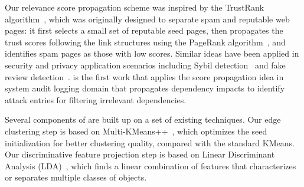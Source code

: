 Our relevance score propagation scheme was inspired by the TrustRank algorithm~\cite{Gyongyi:2004:vldb}, which was originally designed to separate spam and reputable web pages: it first selects a small set of reputable seed pages, then propagates the trust scores following the link structures using the PageRank algorithm~\cite{pagerank}, and identifies spam pages as those with low scores. Similar ideas have been applied in security and privacy application scenarios
including Sybil detection~\cite{cao2012sybilrank,gao2018sybilfuse} and fake review detection~\cite{Rayana:2015:COS:2783258.2783370}.
%
\tool is the first work that applies the score propagation idea in system audit logging domain that propagates dependency impacts to identify attack entries for filtering irrelevant dependencies.








Several components of \tool are built up on a set of existing techniques. Our edge clustering step is based on Multi-KMeans++~\cite{Arthur:2007:KAC:1283383.1283494}, which optimizes the seed initialization for better clustering quality, compared with the standard KMeans. 
Our discriminative feature projection step is based on Linear Discriminant Analysis (LDA)~\cite{Mika99fisherdiscriminant}, which finds a linear combination of features that characterizes or separates multiple classes of objects. 

